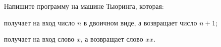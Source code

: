 Напишите программу на машине Тьюринга, которая:
\begin{enumcyr}
    \item получает на вход число $n$ в двоичном виде, а возвращает число $n + 1$;
    \item получает на вход слово $x$, а возвращает слово $xx$.
\end{enumcyr}